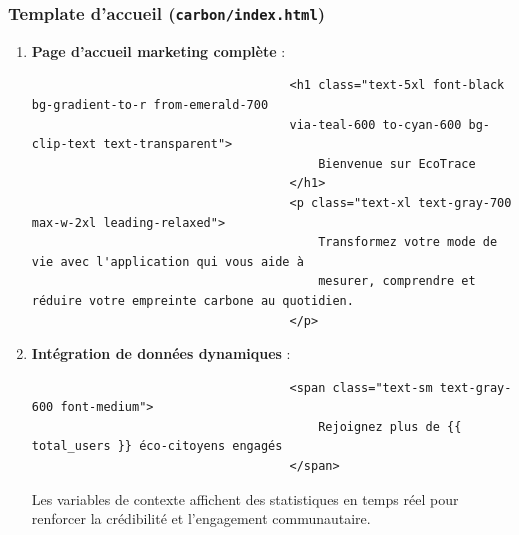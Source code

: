 \documentclass[a4paper,11pt]{article}
\begin{document}
                \subsubsection{Template d'accueil (\texttt{carbon/index.html})}
                    \begin{enumerate}
                        \item \textbf{Page d'accueil marketing complète} :
                            \begin{tcolorbox}[colback=lightgray!6, colframe=black, left=-70mm, right=5mm, top=2mm, bottom=0mm, boxrule=0.1mm]
                                \begin{verbatim}
                                    <h1 class="text-5xl font-black bg-gradient-to-r from-emerald-700 
                                    via-teal-600 to-cyan-600 bg-clip-text text-transparent">
                                        Bienvenue sur EcoTrace
                                    </h1>
                                    <p class="text-xl text-gray-700 max-w-2xl leading-relaxed">
                                        Transformez votre mode de vie avec l'application qui vous aide à 
                                        mesurer, comprendre et réduire votre empreinte carbone au quotidien.
                                    </p>
                                \end{verbatim}
                            \end{tcolorbox}

                        \item \textbf{Intégration de données dynamiques} :
                            \begin{tcolorbox}[colback=lightgray!6, colframe=black, left=-70mm, right=5mm, top=2mm, bottom=0mm, boxrule=0.1mm]
                                \begin{verbatim}
                                    <span class="text-sm text-gray-600 font-medium">
                                        Rejoignez plus de {{ total_users }} éco-citoyens engagés
                                    </span>
                                \end{verbatim}
                            \end{tcolorbox}

                            \noindent Les variables de contexte affichent des statistiques en temps réel pour renforcer la crédibilité et l'engagement communautaire.


\end{enumerate}
\end{document}
